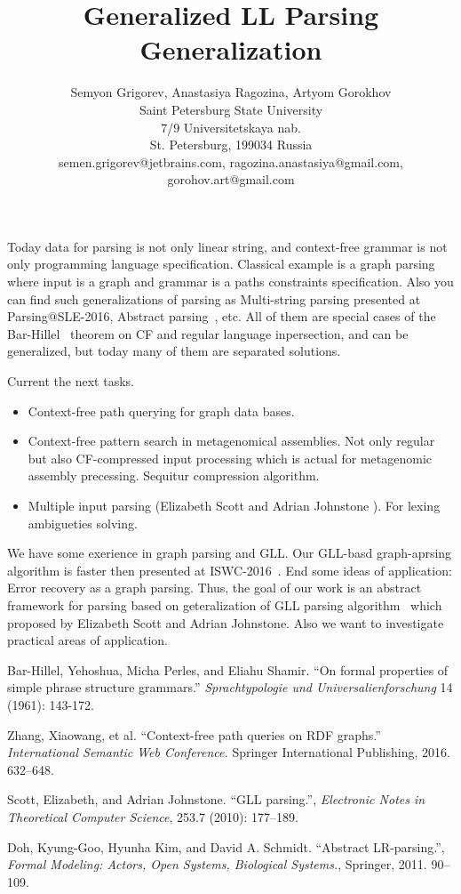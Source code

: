 \documentclass[12pt]{article}  %
\title{Generalized LL Parsing Generalization}
\author{Semyon Grigorev, Anastasiya Ragozina, Artyom Gorokhov
\\
       {Saint Petersburg State University}\\
       {7/9 Universitetskaya nab.}\\
       {St. Petersburg, 199034 Russia}\\
       semen.grigorev@jetbrains.com, ragozina.anastasiya@gmail.com, 
       \\ gorohov.art@gmail.com
       }
\date{}
\theoremstyle{definition}
\theoremstyle{remark}
\begin{document}
\maketitle

Today data for parsing is not only linear string, and context-free grammar is not only programming language specification.
Classical example is a graph parsing where input is a graph and grammar is a paths constraints specification.
Also you can find such generalizations of parsing as Multi-string parsing presented at Parsing@SLE-2016, Abstract parsing~\cite{AbstractParsing}, etc.
All of them are special cases of the Bar-Hillel~\cite{Bar-Hillel} theorem on CF and regular language inpersection, and can be generalized, but today many of them are separated solutions.

 Current the next tasks.
\begin{itemize}
\item Context-free path querying for graph data bases. 
\item Context-free pattern search in metagenomical assemblies. Not only regular but also CF-compressed input processing which is actual for metagenomic assembly precessing. 
Sequitur compression algorithm.
\item Multiple input parsing (Elizabeth Scott and Adrian Johnstone ). For lexing ambigueties solving.
\end{itemize}

We have some exerience in graph parsing and GLL. Our GLL-basd graph-aprsing algorithm is faster 
then presented at ISWC-2016~\cite{CFRDFParsing}.  End some ideas of application: Error recovery as a 
graph parsing. 
Thus, the goal of our work is an abstract framework for parsing based on geteralization of GLL parsing 
algorithm~\cite{GLL} which proposed by Elizabeth Scott and Adrian Johnstone.  Also we want to investigate practical areas of 
application.

\begin{thebibliography}{9}

  Bar-Hillel, Yehoshua, Micha Perles, and Eliahu Shamir.
  ``On formal properties of simple phrase structure grammars.''
   \emph{Sprachtypologie und Universalienforschung}
   14 (1961): 143-172.

  Zhang, Xiaowang, et al.
  ``Context-free path queries on RDF graphs.'' 
  \emph{International Semantic Web Conference.}
   Springer International Publishing, 2016.
   632--648.

  Scott, Elizabeth, and Adrian Johnstone.   
  ``GLL parsing.'',
  \emph{Electronic Notes in Theoretical Computer Science},
  253.7 (2010): 177--189.

  Doh, Kyung-Goo, Hyunha Kim, and David A. Schmidt.
  ``Abstract LR-parsing.'',
  \emph{Formal Modeling: Actors, Open Systems, Biological Systems.},
  Springer,
  2011.
  90--109.



\end{thebibliography}
\end{document}
